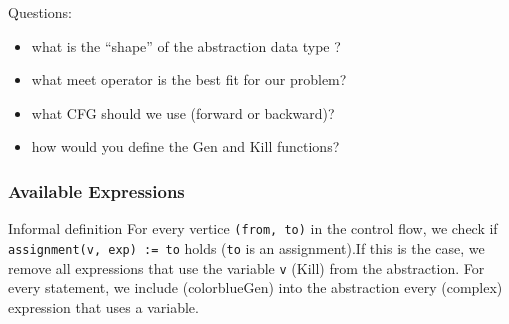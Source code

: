 
\begin{frame}
  Questions:

  \begin{itemize}
   \item what is the ``shape'' of the {\color{blue}abstraction} data type ? \pause
   \item what {\color{blue}meet} operator is the best fit for our problem?
   \item what {\color{blue}CFG} should we use (forward or backward)?   
   \item how would you define the {\color{blue}Gen} and {\color{blue}Kill} functions?   
  \end{itemize}
  
\end{frame}


\begin{frame}
  \frametitle{Available Expressions}

  \begin{block}{Informal definition}
   For every vertice \texttt{(from, to)} in the control flow,
   we check if \texttt{assignment(v, exp) := to} holds (\texttt{to} is
   an assignment).\pause If this is the case, we remove all expressions that
   use the variable \texttt{v} ({\color{blue}Kill}) from the abstraction. For every
   statement, we include ({color{blue}Gen}) into the abstraction every (complex)
   expression that uses a variable. 
  \end{block} 
\end{frame}

